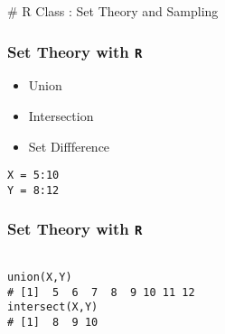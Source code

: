 # R Class : Set Theory and Sampling


\begin{frame}[fragile] 
\frametitle{Set Theory with \texttt{R} }

\begin{itemize}
\item Union
\item Intersection
\item Set Diffference
\end{itemize}
\begin{framed}
\begin{verbatim}
X = 5:10
Y = 8:12
\end{verbatim}
\end{framed}
\end{frame}
\begin{frame}[fragile] 
\frametitle{Set Theory with \texttt{R} }
\begin{framed}
\begin{verbatim}

union(X,Y)
# [1]  5  6  7  8  9 10 11 12
intersect(X,Y)
# [1]  8  9 10

\end{verbatim}
\end{framed}
\end{frame}


